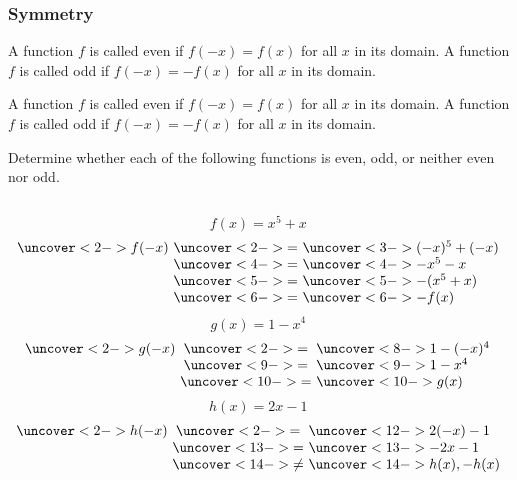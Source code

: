 \begin{frame}
\frametitle{Symmetry}
\begin{definition}
A function $f$ is called even if $f(-x) = f(x)$ for all $x$ in its domain.  A function $f$ is called odd if $f(-x) = -f(x)$ for all $x$ in its domain.
\end{definition}
\end{frame}

\begin{frame}
\begin{definition}
A function $f$ is called even if $f(-x) = f(x)$ for all $x$ in its domain.  A function $f$ is called odd if $f(-x) = -f(x)$ for all $x$ in its domain.
\end{definition}
\begin{example} %
Determine whether each of the following functions is even, odd, or neither even nor odd.

\begin{columns}[t]
\[
f(x) = x^5 + x
\]
\[
\begin{array}{r@{ \ }c@{ \ }l}
\uncover<2->{f(-x)} & \uncover<2->{=} & \uncover<3->{(-x)^5 + (-x)} \\
& \uncover<4->{=} & \uncover<4->{-x^5 - x} \\
& \uncover<5->{=} & \uncover<5->{-(x^5 + x)} \\
& \uncover<6->{=} & \uncover<6->{-f(x)} 
\end{array}
\]
\[
g(x) = 1 - x^4
\]
\[
\begin{array}{r@{ \ }c@{ \ }l}
\uncover<2->{g(-x)} & \uncover<2->{=} & \uncover<8->{1 - (-x)^4} \\
& \uncover<9->{=} & \uncover<9->{1 - x^4} \\
& \uncover<10->{=} & \uncover<10->{g(x)} 
\end{array}
\]
\[
h(x) = 2x - 1
\]
\[
\begin{array}{r@{ \ }c@{ \ }l}
\uncover<2->{h(-x)} & \uncover<2->{=} & \uncover<12->{2(-x) - 1} \\
& \uncover<13->{=} & \uncover<13->{-2x - 1} \\
& \uncover<14->{\neq} & \uncover<14->{h(x), -h(x)}
\end{array}
\]
\end{columns}
\end{example}
\end{frame}
